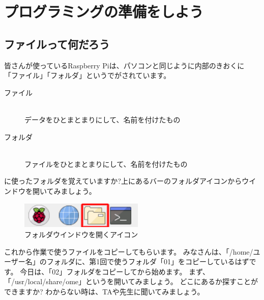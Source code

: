 \clearpage
\section{プログラミングの準備をしよう}
\subsection{ファイルって何だろう}

皆さんが使っているRaspberry Piは、パソコンと同じように内部のきおくに
「ファイル」「フォルダ」というでがされています。
\begin{description}
  \item[ファイル]\mbox{}\\
  データをひとまとまりにして、名前を付けたもの
  \item[フォルダ]\mbox{}\\
  ファイルをひとまとまりにして、名前を付けたもの
\end{description}
  

に使ったフォルダを覚えていますか?上にあるバーのフォルダアイコンからウインドウを開いてみましょう。

\begin{figure}[H]
  \begin{center}
    \includegraphics[keepaspectratio,width=5.898cm,height=1.242cm]{images/chap02/text02-img001.png}
    \caption{フォルダウインドウを開くアイコン}
  \end{center}
  \label{fig:folder_icon}
\end{figure}

これから作業で使うファイルをコピーしてもらいます。
みなさんは、「/home/ユーザー名」のフォルダに、第1回で使うフォルダ「01」をコピーしているはずです。
今日は、「02」フォルダをコピーしてから始めます。
まず、「/usr/local/share/ome」というを開いてみましょう。
どこにあるか探すことができますか?
わからない時は、TAや先生に聞いてみましょう。

